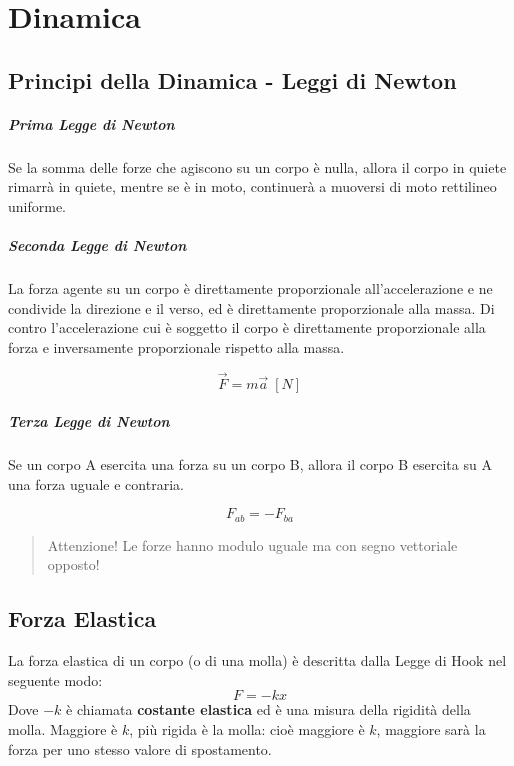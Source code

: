 \chapter{Dinamica}

    \section{Principi della Dinamica - Leggi di Newton}

        \paragraph{Prima Legge di Newton} Se la somma delle forze che agiscono 
        su un corpo è nulla, allora il corpo in quiete rimarrà in quiete, mentre
        se è in moto, continuerà a muoversi di moto rettilineo uniforme.

        \paragraph{Seconda Legge di Newton} La forza agente su un corpo è 
        direttamente proporzionale all'accelerazione e ne condivide la direzione
        e il verso, ed è direttamente proporzionale alla massa. Di contro 
        l'accelerazione cui è soggetto il corpo è direttamente proporzionale 
        alla forza e inversamente proporzionale rispetto alla massa.

        \begin{equation}
            \vec{F} = m \vec{a} \; [N]
        \end{equation}

        \paragraph{Terza Legge di Newton} Se un corpo A esercita una forza su 
        un corpo B, allora il corpo B esercita su A una forza uguale e 
        contraria.

        \begin{equation}
            F_{ab} = - F_{ba}
        \end{equation}

        \begin{quote}
            Attenzione! Le forze hanno modulo uguale ma con segno vettoriale 
            opposto!
        \end{quote}

    \section{Forza Elastica} La forza elastica di un corpo (o di una molla) è 
    descritta dalla Legge di Hook nel seguente modo:
        \begin{equation}
            F = -kx
        \end{equation}
    Dove $-k$ è chiamata \textbf{costante elastica} ed è una misura della 
    rigidità della molla. Maggiore è $k$, più rigida è la molla: cioè maggiore è
    $k$, maggiore sarà la forza per uno stesso valore di spostamento.

